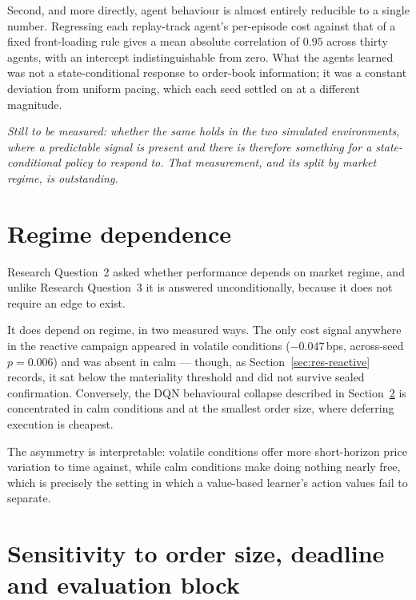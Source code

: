 Second, and more directly, agent behaviour is almost entirely reducible to a single number.
Regressing each replay-track agent's per-episode cost against that of a fixed
front-loading rule gives a mean absolute correlation of $0.95$ across thirty agents, with an
intercept indistinguishable from zero. What the agents learned was not a state-conditional
response to order-book information; it was a constant deviation from uniform pacing, which
each seed settled on at a different magnitude.

\emph{Still to be measured: whether the same holds in the two simulated environments,
where a predictable signal is present and there is therefore something for a
state-conditional policy to respond to. That measurement, and its split by market regime,
is outstanding.}

\section{Regime dependence}\label{sec:res-regime}

Research Question~2 asked whether performance depends on market regime, and unlike
Research Question~3 it is answered unconditionally, because it does not require an edge to
exist.

It does depend on regime, in two measured ways. The only cost signal anywhere in the
reactive campaign appeared in volatile conditions ($-0.047$\,bps, across-seed $p = 0.006$)
and was absent in calm --- though, as Section~\ref{sec:res-reactive} records, it sat below
the materiality threshold and did not survive sealed confirmation. Conversely, the DQN
behavioural collapse described in Section~\ref{sec:res-robust} is concentrated in calm
conditions and at the smallest order size, where deferring execution is cheapest.

The asymmetry is interpretable: volatile conditions offer more short-horizon price variation
to time against, while calm conditions make doing nothing nearly free, which is precisely
the setting in which a value-based learner's action values fail to separate.

\section{Sensitivity to order size, deadline and evaluation block}\label{sec:res-robust}

